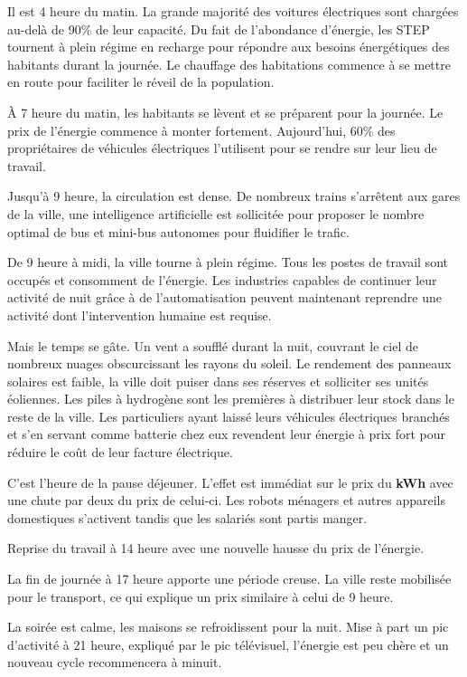 Il est 4 heure du matin. La grande majorité des voitures électriques sont chargées au-delà de 90\% de leur capacité.
Du fait de l'abondance d'énergie, les STEP tournent à plein régime en recharge pour répondre aux besoins
énergétiques des habitants durant la journée.
Le chauffage des habitations commence à se mettre en route pour faciliter le réveil de la population.

À 7 heure du matin, les habitants se lèvent et se préparent pour la journée. Le prix de l'énergie commence à monter
fortement. Aujourd'hui, 60\% des propriétaires de véhicules électriques l'utilisent pour se rendre sur leur lieu de travail.

Jusqu'à 9 heure, la circulation est dense. De nombreux trains s'arrêtent aux gares de la ville,
une intelligence artificielle est sollicitée pour proposer le nombre optimal
de bus et mini-bus autonomes pour fluidifier le trafic.

De 9 heure à midi, la ville tourne à plein régime. Tous les postes de travail sont occupés et consomment de l'énergie.
Les industries capables de continuer leur activité de nuit grâce à de l'automatisation peuvent maintenant
reprendre une activité dont l'intervention humaine est requise.

Mais le temps se gâte. Un vent a soufflé durant la nuit, couvrant le ciel de nombreux nuages obscurcissant
les rayons du soleil. Le rendement des panneaux solaires est faible, la ville doit puiser dans
ses réserves et solliciter ses unités éoliennes.
Les piles à hydrogène sont les premières à distribuer leur stock dans le reste de la ville.
Les particuliers ayant laissé leurs véhicules électriques branchés et s'en servant comme batterie chez eux revendent
leur énergie à prix fort pour réduire le coût de leur facture électrique.

C'est l'heure de la pause déjeuner. L'effet est immédiat sur le prix du \textbf{kWh} avec une chute par deux du prix
de celui-ci. Les robots ménagers et autres appareils domestiques s'activent tandis que les salariés sont partis manger.

Reprise du travail à 14 heure avec une nouvelle hausse du prix de l'énergie.

La fin de journée à 17 heure apporte une période creuse. La ville reste mobilisée pour le transport, ce qui explique
un prix similaire à celui de 9 heure.

La soirée est calme, les maisons se refroidissent pour la nuit. Mise à part un pic d'activité à 21 heure, expliqué par le
pic télévisuel, l'énergie est peu chère et un nouveau cycle recommencera à minuit.

